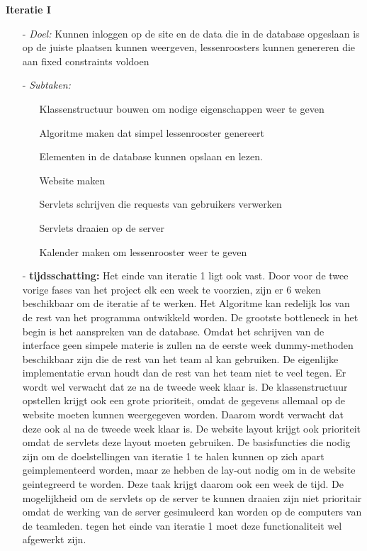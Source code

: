 \documentclass{article}
\begin{document}
\textbf{Iteratie I}
\begin{itemize}
\item[-] \textit{Doel:} Kunnen inloggen op de site en de data die in de database opgeslaan is op de juiste plaatsen kunnen weergeven, lessenroosters kunnen genereren die aan fixed constraints voldoen\\[-5mm]
\item[-] \textit{Subtaken:} \\[-5mm]
\begin{itemize}
	\item[] Klassenstructuur bouwen om nodige eigenschappen weer te geven \\[-5mm]
	\item[] Algoritme maken dat simpel lessenrooster genereert \\[-5mm]
	\item[] Elementen in de database kunnen opslaan en lezen. \\[-5mm]
	\item[] Website maken \\[-5mm]
	\item[] Servlets schrijven die requests van gebruikers verwerken \\[-5mm]
	\item[] Servlets draaien op de server \\[-5mm]
	\item[] Kalender maken om lessenrooster weer te geven \\[-5mm]
\end{itemize}
\item[-] \textbf{tijdsschatting:} Het einde van iteratie 1 ligt ook vast. Door voor de twee vorige fases van het project elk een week te voorzien, zijn er 6 weken beschikbaar om de iteratie af te werken.
Het Algoritme kan redelijk los van de rest van het programma ontwikkeld worden. 
De grootste bottleneck in het begin is het aanspreken van de database. Omdat het schrijven van de interface geen simpele materie is zullen na de eerste week dummy-methoden beschikbaar zijn die de rest van het team al kan gebruiken. De eigenlijke implementatie ervan houdt dan de rest van het team niet te veel tegen. Er wordt wel verwacht dat ze na de tweede week klaar is. 
De klassenstructuur opstellen krijgt ook een grote prioriteit, omdat de gegevens allemaal op de website moeten kunnen weergegeven worden. Daarom wordt verwacht dat deze ook al na de tweede week klaar is.
De website layout krijgt ook prioriteit omdat de servlets deze layout moeten gebruiken. De basisfuncties die nodig zijn om de doelstellingen van iteratie 1 te halen kunnen op zich apart geimplementeerd worden, maar ze hebben de lay-out nodig om in de website geintegreerd te worden. Deze taak krijgt daarom ook een week de tijd.
De mogelijkheid om de servlets op de server te kunnen draaien zijn niet prioritair omdat de werking van de server gesimuleerd kan worden op de computers van de teamleden. tegen het einde van iteratie 1 moet deze functionaliteit wel afgewerkt zijn. 
\end{itemize}
\end{document}
